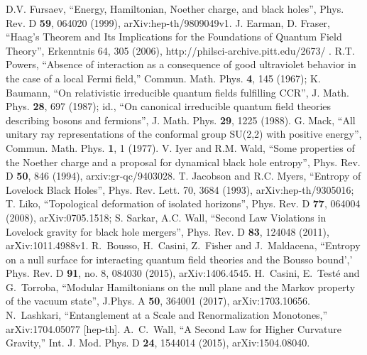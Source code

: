 \documentclass[12pt]{article}
\begin{document}
\begin{thebibliography}{299}
D.V. Fursaev, ``Energy, Hamiltonian, Noether charge, and black holes'', Phys. Rev. D \textbf{59}, 064020 (1999), arXiv:hep-th/9809049v1.
J. Earman, D. Fraser, ``Haag's Theorem and Its Implications for the Foundations of Quantum Field Theory'', Erkenntnis 64, 305 (2006), http://philsci-archive.pitt.edu/2673/ .
R.T. Powers, ``Absence of interaction as a consequence of good ultraviolet behavior in the case of a local Fermi field,'' Commun. Math. Phys. \textbf{4}, 145 (1967); K. Baumann, ``On relativistic irreducible quantum fields fulfilling CCR'', J. Math. Phys. \textbf{28}, 697 (1987); id., ``On canonical irreducible quantum field theories describing bosons and fermions'', J. Math. Phys. \textbf{29}, 1225 (1988).
G. Mack, ``All unitary ray representations of the conformal group SU(2,2) with positive energy'', Commun. Math. Phys. \textbf{1}, 1 (1977).
V. Iyer and R.M. Wald, ``Some properties of the Noether charge and a proposal for dynamical black hole entropy'', Phys. Rev. D \textbf{50}, 846 (1994), arxiv:gr-qc/9403028.
T. Jacobson and R.C. Myers, ``Entropy of Lovelock Black Holes'', Phys. Rev. Lett. 70, 3684 (1993),
arXiv:hep-th/9305016;
T. Liko, ``Topological deformation of isolated horizons'', Phys. Rev. D \textbf{77}, 064004 (2008), arXiv:0705.1518; S. Sarkar, A.C. Wall, ``Second Law Violations in Lovelock gravity for black hole mergers'', Phys. Rev. D \textbf{83}, 124048 (2011), arXiv:1011.4988v1.
  R.~Bousso, H.~Casini, Z.~Fisher and J.~Maldacena,
  ``Entropy on a null surface for interacting quantum field theories and the Bousso bound','
  Phys. Rev. D {\bf 91}, no. 8, 084030 (2015),
  arXiv:1406.4545.
  H.~Casini, E.~Test\'e and G.~Torroba,
  ``Modular Hamiltonians on the null plane and the Markov property of the vacuum state'', J.Phys. A \textbf{50}, 364001 (2017),
  arXiv:1703.10656.
  N.~Lashkari,
  ``Entanglement at a Scale and Renormalization Monotones,''
  arXiv:1704.05077 [hep-th].
  A.~C.~Wall,
  ``A Second Law for Higher Curvature Gravity,''
  Int. J. Mod. Phys. D {\bf 24}, 1544014 (2015),
  arXiv:1504.08040.

\end{thebibliography}
\end{document}
